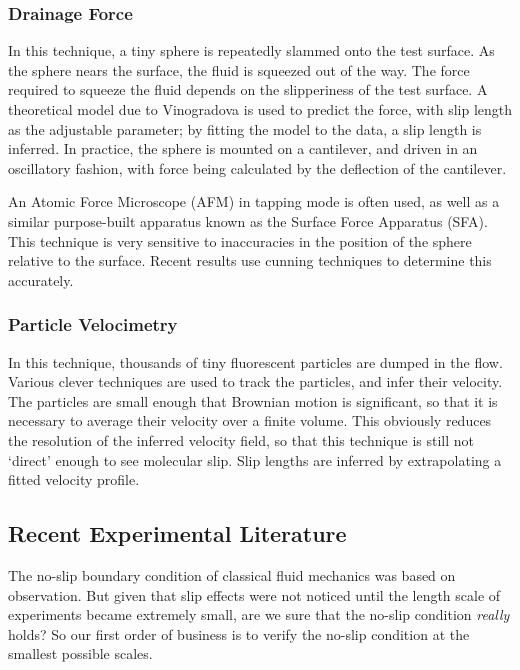 \documentclass[12pt, a4paper, twoside, openright]{book}
\begin{document}
\subsubsection*{Drainage Force}

In this technique, a tiny sphere is repeatedly slammed onto the test surface. As the sphere nears the surface, the fluid is squeezed out of the way.  The force required to squeeze the fluid depends on the slipperiness of the test surface.  A theoretical model due to Vinogradova is used to predict the force, with slip length as the adjustable parameter; by fitting the model to the data, a slip length is inferred. In practice, the sphere is mounted on a cantilever, and driven in an oscillatory fashion, with force being calculated by the deflection of the cantilever.

An Atomic Force Microscope (AFM) in tapping mode is often used, as well as a similar purpose-built apparatus known as the Surface Force Apparatus (SFA).  This technique is very sensitive to inaccuracies in the position of the sphere relative to the surface.  Recent results use cunning techniques to determine this accurately.

\subsubsection*{Particle Velocimetry}

In this technique, thousands of tiny fluorescent particles are dumped in the flow.  Various clever techniques are used to track the particles, and infer their velocity.  The particles are small enough that Brownian motion is significant, so that it is necessary to average their velocity over a finite volume.  This obviously reduces the resolution of the inferred velocity field, so that this technique is still not `direct' enough to see molecular slip. Slip lengths are inferred by extrapolating a fitted velocity profile.

\subsection*{Recent Experimental Literature}

The no-slip boundary condition of classical fluid mechanics was based on observation. But given that slip effects were not noticed until the length scale of experiments became extremely small, are we sure that the no-slip condition \emph{really} holds?  So our first order of business is to verify the no-slip condition at the smallest possible scales.
\end{document}
